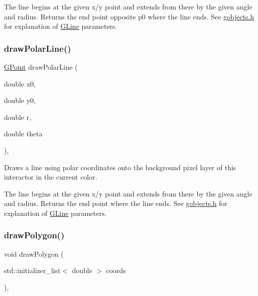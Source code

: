 The line begins at the given x/y point and extends from there by the given angle and radius. Returns the end point opposite p0 where the line ends. See \mbox{\hyperlink{gobjects_8h_source}{gobjects.\+h}} for explanation of \mbox{\hyperlink{classGLine}{G\+Line}} parameters. \mbox{\label{classGDrawingSurface_ad3e646f90005295f2bbdf37d2bcb39d2}} 
\subsubsection{\texorpdfstring{draw\+Polar\+Line()}{drawPolarLine()}\hspace{0.1cm}{\footnotesize\ttfamily [2/2]}}
{\footnotesize\ttfamily \mbox{\hyperlink{structGPoint}{G\+Point}} draw\+Polar\+Line (\begin{DoxyParamCaption}\item[{double}]{x0,  }\item[{double}]{y0,  }\item[{double}]{r,  }\item[{double}]{theta }\end{DoxyParamCaption})\hspace{0.3cm}{\ttfamily [virtual]}, {\ttfamily [inherited]}}



Draws a line using polar coordinates onto the background pixel layer of this interactor in the current color. 

The line begins at the given x/y point and extends from there by the given angle and radius. Returns the end point where the line ends. See \mbox{\hyperlink{gobjects_8h_source}{gobjects.\+h}} for explanation of \mbox{\hyperlink{classGLine}{G\+Line}} parameters. \mbox{\label{classGDrawingSurface_afddec0a905108d8a8d6809a157f26776}} 
\subsubsection{\texorpdfstring{draw\+Polygon()}{drawPolygon()}\hspace{0.1cm}{\footnotesize\ttfamily [1/2]}}
{\footnotesize\ttfamily void draw\+Polygon (\begin{DoxyParamCaption}\item[{std\+::initializer\+\_\+list$<$ double $>$}]{coords }\end{DoxyParamCaption})\hspace{0.3cm}{\ttfamily [virtual]}, {\ttfamily [inherited]}}



